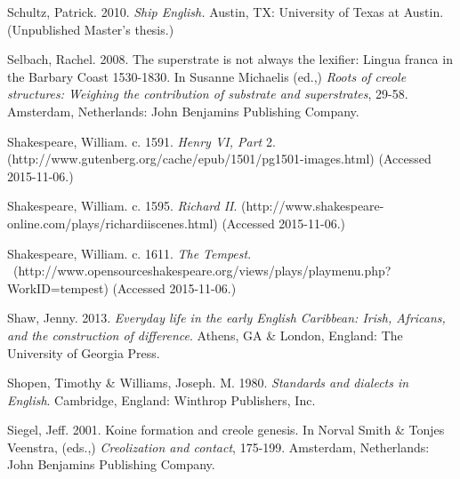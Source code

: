 \begin{styleStandard}
Schultz, Patrick. 2010. \textit{Ship English.} Austin, TX: University of Texas at Austin. (Unpublished Master’s thesis.) 
\end{styleStandard}


\begin{styleStandard}
Selbach, Rachel. 2008. The superstrate is not always the lexifier: Lingua franca in the Barbary Coast 1530-1830. In Susanne Michaelis (ed.,) \textit{Roots of creole structures: Weighing the contribution of substrate and superstrates}, 29-58. Amsterdam, Netherlands: John Benjamins Publishing Company.
\end{styleStandard}


\begin{styleStandard}
Shakespeare, William. c. 1591. \textit{Henry VI, Part} 2. (http://www.gutenberg.org/cache/epub/1501/pg1501-images.html) (Accessed 2015-11-06.)
\end{styleStandard}


\begin{styleStandard}
Shakespeare, William. c. 1595. \textit{Richard II}. (http://www.shakespeare-online.com/plays/richardiiscenes.html) (Accessed 2015-11-06.)
\end{styleStandard}


\begin{styleStandard}
Shakespeare, William. c. 1611. \textit{The Tempest}. \ (http://www.opensourceshakespeare.org/views/plays/playmenu.php?WorkID=tempest) (Accessed 2015-11-06.)
\end{styleStandard}


\begin{styleStandard}
Shaw, Jenny. 2013. \textit{Everyday life in the early English Caribbean: Irish, Africans, and the construction of difference}. Athens, GA \& London, England: The University of Georgia Press.
\end{styleStandard}


\begin{styleStandard}
Shopen, Timothy \& Williams, Joseph. M. 1980. \textit{Standards and dialects in English}. Cambridge, England: Winthrop Publishers, Inc.
\end{styleStandard}


\begin{styleStandard}
Siegel, Jeff. 2001. Koine formation and creole genesis. In Norval Smith \& Tonjes Veenstra, (eds.,) \textit{Creolization and contact}, 175-199. Amsterdam, Netherlands: John Benjamins Publishing Company.
\end{styleStandard}


